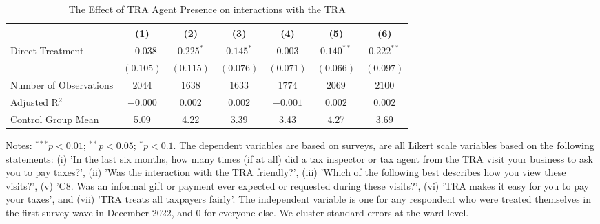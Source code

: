 
\begin{table}
\caption{The Effect of TRA Agent Presence on interactions with the TRA}
\begin{center}
\begin{threeparttable}
\begin{tabular}{l c c c c c c}
\toprule
 & (1) & (2) & (3) & (4) & (5) & (6) \\
\midrule
Direct Treatment       & $-0.038$  & $0.225^{*}$ & $0.145^{*}$ & $0.003$   & $0.140^{**}$ & $0.222^{**}$ \\
                       & $(0.105)$ & $(0.115)$   & $(0.076)$   & $(0.071)$ & $(0.066)$    & $(0.097)$    \\
\midrule
Number of Observations & $2044$    & $1638$      & $1633$      & $1774$    & $2069$       & $2100$       \\
Adjusted R$^2$         & $-0.000$  & $0.002$     & $0.002$     & $-0.001$  & $0.002$      & $0.002$      \\
Control Group Mean     & 5.09      & 4.22        & 3.39        & 3.43      & 4.27         & 3.69         \\
\bottomrule
\end{tabular}
\begin{tablenotes}[flushleft]
\scriptsize{Notes: $^{***}p<0.01$; $^{**}p<0.05$; $^{*}p<0.1$. The dependent variables are based on surveys, are all Likert scale variables based on the following statements: (i) 'In the last six months, how many times (if at all) did a tax inspector or tax agent from the TRA visit your business to ask you to pay taxes?', (ii) 'Was the interaction with the TRA friendly?', (iii) 'Which of the following best describes how you view these visits?', (v) 'C8. Was an informal gift or payment ever expected or requested during these visits?', (vi) 'TRA makes it easy for you to pay your taxes', and (vii) 'TRA treats all taxpayers fairly'. The independent variable is one for any respondent who were treated themselves in the first survey wave in December 2022, and 0 for everyone else. We cluster standard errors at the ward level.}
\end{tablenotes}
\end{threeparttable}
\label{table:coefficients}
\end{center}
\end{table}
